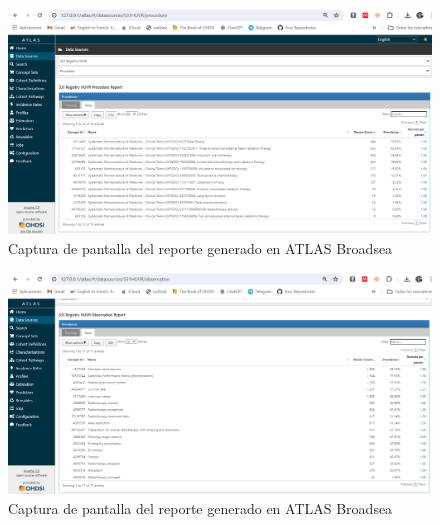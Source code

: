 \begin{figure}[H]
    \centering
    \includegraphics[width=1\textwidth]{figures/atlasREPORTprocedure.png}
    \caption{Captura de pantalla del reporte  generado en ATLAS Broadsea}
    \label{figure:atlasREPORTprocedure}
\end{figure}

\begin{figure}[H]
    \centering
    \includegraphics[width=1\textwidth]{figures/atlasREPORTobservation.png}
    \caption{Captura de pantalla del reporte  generado en ATLAS Broadsea}
    \label{figure:atlasREPORTobservation}
\end{figure}